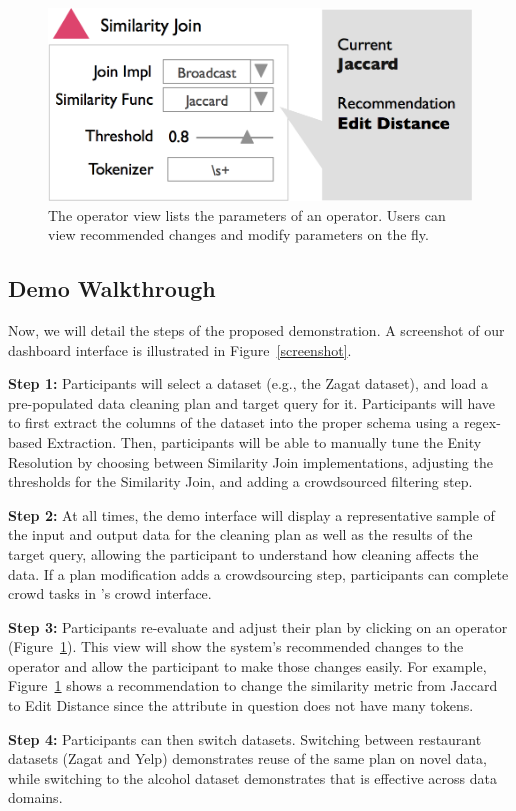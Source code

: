 \begin{figure}[t]
\centering
 \includegraphics[width=0.8\columnwidth]{figs/dashboard_recsys.png}
 \caption{The operator view lists the parameters of an operator. Users can view recommended changes and modify parameters on the fly.}
 \label{screenshot-rec}\vspace{-1.75em}
\end{figure}

\subsection{Demo Walkthrough}
Now, we will detail the steps of the proposed demonstration.
A screenshot of our dashboard interface is illustrated in Figure~\ref{screenshot}.

\vspace{0.2em}

\noindent\textbf{Step 1: } Participants will select a dataset (e.g., the Zagat dataset), and load a pre-populated data cleaning plan and target query for it.
Participants will have to first extract the columns of the dataset into the proper schema using a regex-based Extraction.
Then, participants will be able to manually tune the Enity Resolution by choosing between Similarity Join implementations, adjusting the thresholds for the Similarity Join, and adding a crowdsourced filtering step.

\vspace{0.2em}

\noindent\textbf{Step 2: } At all times, the demo interface will display a representative sample of the input and output data for the cleaning plan as well as the results of the target query, allowing the participant to understand how cleaning affects the data. 
If a plan modification adds a crowdsourcing step, participants can complete crowd tasks in \sys's crowd interface.

\vspace{0.2em}

\noindent\textbf{Step 3:} Participants re-evaluate and adjust their plan by clicking on an operator (Figure~\ref{screenshot-rec}).
This view will show the system's recommended changes to the operator and allow the participant to make those changes easily.
For example, Figure~\ref{screenshot-rec} shows a recommendation to change the similarity metric from Jaccard to Edit Distance since the attribute in question does not have many tokens.

\vspace{0.2em}

\noindent\textbf{Step 4: } Participants can then switch datasets. Switching between restaurant datasets (Zagat and Yelp) demonstrates reuse of the same plan on novel data, while switching to the alcohol dataset demonstrates that \sys is effective across data domains.
